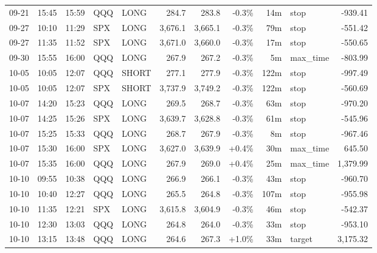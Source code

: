 \documentclass[11pt,a4paper,twoside]{article}
\begin{document}
\begin{center}
\begin{longtable}{>{\color{txtmain}}l l l l l r r r r >{\color{txtmain}}l r}
09-21 & 15:45 & 15:59 & QQQ & LONG & 284.7 & 283.8 & \textcolor{lossred}{-0.3\%} & 14m & stop & \textcolor{lossred}{-939.41} \\
09-27 & 10:10 & 11:29 & SPX & LONG & 3,676.1 & 3,665.1 & \textcolor{lossred}{-0.3\%} & 79m & stop & \textcolor{lossred}{-551.42} \\
09-27 & 11:35 & 11:52 & SPX & LONG & 3,671.0 & 3,660.0 & \textcolor{lossred}{-0.3\%} & 17m & stop & \textcolor{lossred}{-550.65} \\
09-30 & 15:55 & 16:00 & QQQ & LONG & 267.9 & 267.2 & \textcolor{lossred}{-0.3\%} & 5m & max\_time & \textcolor{lossred}{-803.99} \\
10-05 & 10:05 & 12:07 & QQQ & SHORT & 277.1 & 277.9 & \textcolor{lossred}{-0.3\%} & 122m & stop & \textcolor{lossred}{-997.49} \\
10-05 & 10:05 & 12:07 & SPX & SHORT & 3,737.9 & 3,749.2 & \textcolor{lossred}{-0.3\%} & 122m & stop & \textcolor{lossred}{-560.69} \\
10-07 & 14:20 & 15:23 & QQQ & LONG & 269.5 & 268.7 & \textcolor{lossred}{-0.3\%} & 63m & stop & \textcolor{lossred}{-970.20} \\
10-07 & 14:25 & 15:26 & SPX & LONG & 3,639.7 & 3,628.8 & \textcolor{lossred}{-0.3\%} & 61m & stop & \textcolor{lossred}{-545.96} \\
10-07 & 15:25 & 15:33 & QQQ & LONG & 268.7 & 267.9 & \textcolor{lossred}{-0.3\%} & 8m & stop & \textcolor{lossred}{-967.46} \\
10-07 & 15:30 & 16:00 & SPX & LONG & 3,627.0 & 3,639.9 & \textcolor{wingreen}{+0.4\%} & 30m & max\_time & \textcolor{wingreen}{645.50} \\
10-07 & 15:35 & 16:00 & QQQ & LONG & 267.9 & 269.0 & \textcolor{wingreen}{+0.4\%} & 25m & max\_time & \textcolor{wingreen}{1,379.99} \\
10-10 & 09:55 & 10:38 & QQQ & LONG & 266.9 & 266.1 & \textcolor{lossred}{-0.3\%} & 43m & stop & \textcolor{lossred}{-960.70} \\
10-10 & 10:40 & 12:27 & QQQ & LONG & 265.5 & 264.8 & \textcolor{lossred}{-0.3\%} & 107m & stop & \textcolor{lossred}{-955.98} \\
10-10 & 11:35 & 12:21 & SPX & LONG & 3,615.8 & 3,604.9 & \textcolor{lossred}{-0.3\%} & 46m & stop & \textcolor{lossred}{-542.37} \\
10-10 & 12:30 & 13:03 & QQQ & LONG & 264.8 & 264.0 & \textcolor{lossred}{-0.3\%} & 33m & stop & \textcolor{lossred}{-953.10} \\
10-10 & 13:15 & 13:48 & QQQ & LONG & 264.6 & 267.3 & \textcolor{wingreen}{+1.0\%} & 33m & target & \textcolor{wingreen}{3,175.32} \\

\end{longtable}
\end{center}
\end{document}
